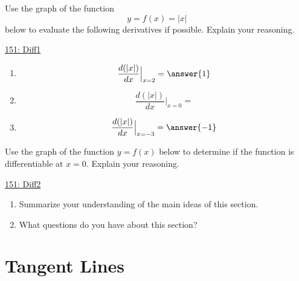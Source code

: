 \documentclass{ximera}
\begin{document}
\begin{exploration}  \label{Exp9485rf5r}

Use the graph of the function 
\[
    y = f(x) = |x|
\]
below to evaluate the following derivatives if possible. Explain your reasoning.

\begin{onlineOnly}
    \begin{center}
\end{center}
\end{onlineOnly}

\href{https://www.desmos.com/calculator/us2fruzbra}{151: Diff1}

\begin{enumerate}
\item 
\[
 \frac{d (|x|)}{dx}\Big|_{x=2} = \answer{1}
\]

\item 
\[
 \frac{d (|x|)}{dx}\Big|_{x=0} = 
\]

\item 
\[
 \frac{d (|x|)}{dx}\Big|_{x=-3} = \answer{-1}
\]
\end{enumerate}
\end{exploration}


\begin{exploration} \label{Exp4kfgk4g4}
Use the graph of the function $y=f(x)$ below to determine if the function is differentiable at $x=0$. Explain your reasoning.

\begin{onlineOnly}
    \begin{center}
\end{center}
\end{onlineOnly}

\href{https://www.desmos.com/calculator/ov8qt938ot}{151: Diff2}
\end{exploration}

\begin{question}  \label{Q64566y565454}
\begin{enumerate}
\item Summarize your understanding of the main ideas of this section.

\item What questions do you have about this section?
\end{enumerate}
\begin{freeResponse}
\end{freeResponse}
\end{question}



\section{Tangent Lines}
\end{document}
